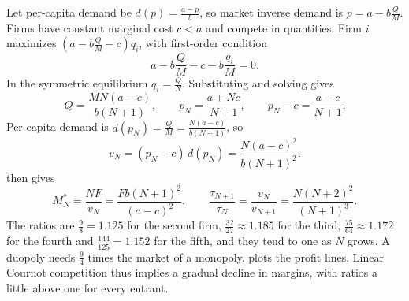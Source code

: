 \begin{example}\label{ex:01-cournot-thresholds}
Let per-capita demand be $d(p) = \frac{a - p}{b}$, so market inverse demand is $p = a - b\frac{Q}{M}$. Firms
have constant marginal cost $c < a$ and compete in quantities. Firm $i$ maximizes
$\left(a - b\frac{Q}{M} - c\right)q_i$, with first-order condition
\[
  a - b\frac{Q}{M} - c - b\frac{q_i}{M} = 0 .
\]
In the symmetric equilibrium $q_i = \frac{Q}{N}$. Substituting and solving gives
\[
  Q = \frac{M N (a - c)}{b(N + 1)}, \qquad p_N = \frac{a + Nc}{N + 1}, \qquad p_N - c = \frac{a - c}{N + 1} .
\]
Per-capita demand is $d(p_N) = \frac{Q}{M} = \frac{N(a - c)}{b(N + 1)}$, so
\[
  v_N = (p_N - c)\,d(p_N) = \frac{N(a - c)^2}{b(N + 1)^2} .
\]
 then gives
\[
  M_N^* = \frac{N F}{v_N} = \frac{F b (N + 1)^2}{(a - c)^2},
  \qquad
  \frac{\tau_{N+1}}{\tau_N} = \frac{v_N}{v_{N+1}} = \frac{N(N + 2)^2}{(N + 1)^3} .
\]
The ratios are $\frac{9}{8} = 1.125$ for the second firm, $\frac{32}{27} \approx 1.185$ for the third,
$\frac{75}{64} \approx 1.172$ for the fourth and $\frac{144}{125} = 1.152$ for the fifth, and they tend to one
as $N$ grows. A duopoly needs $\frac{9}{4}$ times the market of a monopoly.  plots the
profit lines. Linear Cournot competition thus implies a gradual decline in margins, with ratios a little above
one for every entrant.
\end{example}

